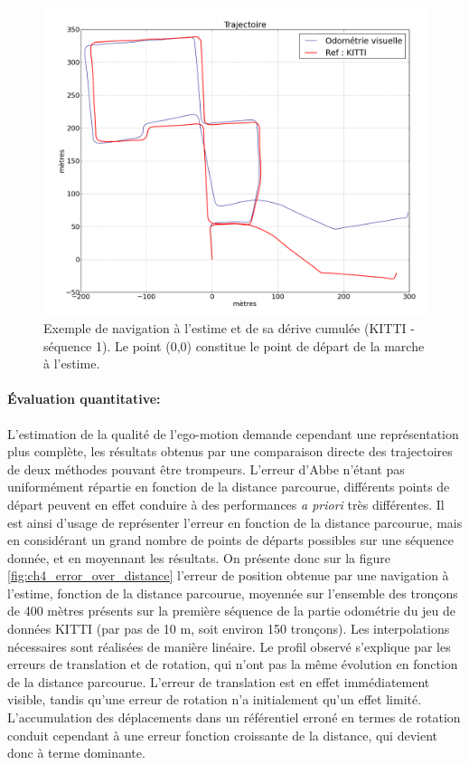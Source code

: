 \begin{figure}[h]
		\includegraphics[width=\textwidth]{Chapter4/graphics/dead_reckoning_overall.png}
		\caption{Exemple de navigation à l'estime et de sa dérive cumulée (KITTI - séquence 1). Le point (0,0) constitue le point de départ de la marche à l'estime.}
		\label{fig:ch4_deadreckoning_overall}
\end{figure}

\paragraph{Évaluation quantitative:\\}
L'estimation de la qualité de l'ego-motion demande cependant une représentation plus complète, les résultats obtenus par une comparaison directe des trajectoires de deux méthodes pouvant être trompeurs. L'erreur d'Abbe n'étant pas uniformément répartie en fonction de la distance parcourue, différents points de départ peuvent en effet conduire à des performances \emph{a priori} très différentes. Il est ainsi d'usage de représenter l'erreur en fonction de la distance parcourue, mais en considérant un grand nombre de points de départs possibles sur une séquence donnée, et en moyennant les résultats. On présente donc sur la figure \ref{fig:ch4_error_over_distance} l'erreur de position obtenue par une navigation à l'estime, fonction de la distance parcourue, moyennée sur l'ensemble des tronçons de 400 mètres présents sur la première séquence de la partie \og odométrie\fg{} du jeu de données KITTI (par pas de 10 m, soit environ 150 tronçons). Les interpolations nécessaires sont réalisées de manière linéaire. Le profil observé s'explique par les erreurs de translation et de rotation, qui n'ont pas la même évolution en fonction de la distance parcourue. L'erreur de translation est en effet immédiatement visible, tandis qu'une erreur de rotation n'a initialement qu'un effet limité. L'accumulation des déplacements dans un référentiel erroné en termes de rotation conduit cependant à une erreur fonction croissante de la distance, qui devient donc à terme dominante.


